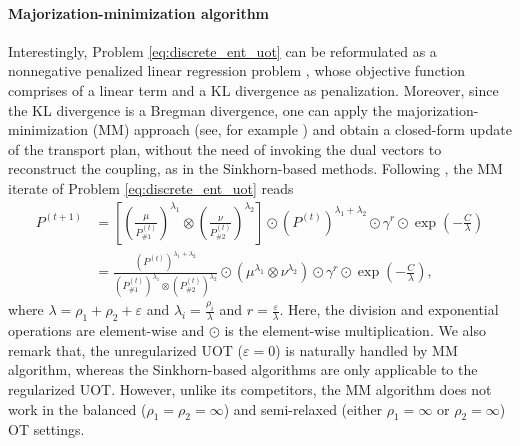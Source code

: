 \paragraph{Majorization-minimization algorithm} Interestingly, Problem \eqref{eq:discrete_ent_uot}
can be reformulated as a nonnegative penalized linear regression problem \citep{Chapel21},
whose objective function comprises of a linear term and a KL divergence as penalization.
Moreover, since the KL divergence is a Bregman divergence, one can apply the
majorization-minimization (MM) approach (see, for example \citep{Hunter04,Sun17}) and obtain
a closed-form update of the transport plan, without the need of invoking the dual vectors
to reconstruct the coupling, as in the Sinkhorn-based methods. Following \citep{Chapel21},
the MM iterate of Problem \eqref{eq:discrete_ent_uot} reads
\begin{align}
    P^{(t+1)} &= \left[ \left( \frac{\mu}{P^{(t)}_{\# 1}}\right)^{\lambda_1} \otimes
    \left( \frac{\nu}{P^{(t)}_{\# 2}}\right)^{\lambda_2} \right] \odot
    (P^{(t)})^{\lambda_1 + \lambda_2} \odot \gamma^r \odot \exp\left(-\frac{C}{\lambda} \right) \\
    &= \frac{(P^{(t)})^{\lambda_1 + \lambda_2}}{(P^{(t)}_{\# 1})^{\lambda_1}
    \otimes (P^{(t)}_{\# 2})^{\lambda_2}}
    \odot \left( \mu^{\lambda_1} \otimes \nu^{\lambda_2} \right) \odot \gamma^r
    \odot \exp\left(-\frac{C}{\lambda} \right),
\end{align}
where $\lambda = \rho_1 + \rho_2 + \varepsilon$ and
$\lambda_i = \frac{\rho_i}{\lambda}$ and $r = \frac{\varepsilon}{\lambda}$.
Here, the division and exponential operations are element-wise and
$\odot$ is the element-wise multiplication. We also remark that,
the unregularized UOT ($\varepsilon = 0$) is naturally handled by MM algorithm,
whereas the Sinkhorn-based algorithms are only applicable to the regularized UOT. However,
unlike its competitors, the MM algorithm does not work in the balanced ($\rho_1=\rho_2=\infty$)
and semi-relaxed (either $\rho_1=\infty$ or $\rho_2=\infty$) OT settings.

